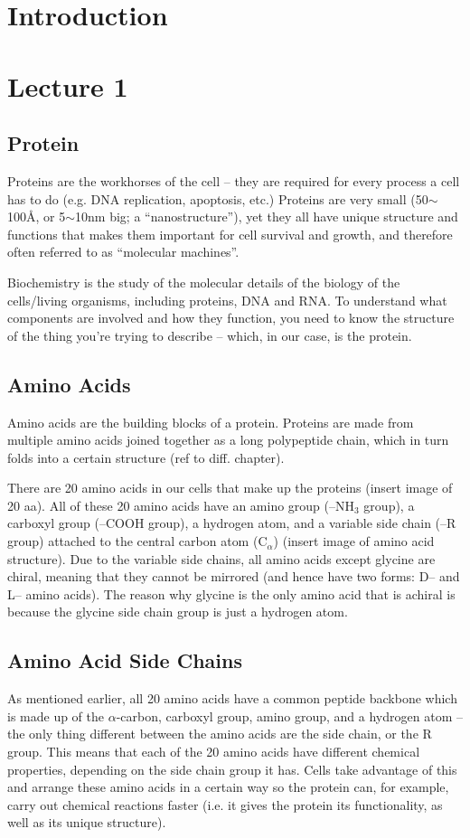 \documentclass[a4paper, 12pt]{report}
\newcommand{\mychapter}[2]{
    \setcounter{chapter}{#1}
    \setcounter{section}{0}
    \chapter*{#2}
    \addcontentsline{toc}{chapter}{#2}
}
\begin{document}


\tableofcontents
\newpage

\mychapter{0}{Introduction}

\mychapter{1}{Lecture 1}
\section{Protein}

Proteins are the workhorses of the cell -- they are required for every process a cell has to do (e.g. DNA replication, apoptosis, etc.)
Proteins are very small (50$\sim$100\AA{}, or 5$\sim$10nm big; a ``nanostructure''), yet they all have unique structure and functions that makes them important for cell survival and growth, and therefore often referred to as ``molecular machines''.

Biochemistry is the study of the molecular details of the biology of the cells/living organisms, including proteins, DNA and RNA.
To understand what components are involved and how they function, you need to know the structure of the thing you're trying to describe -- which, in our case, is the protein.

\section{Amino Acids}

Amino acids are the building blocks of a protein.
Proteins are made from multiple amino acids joined together as a long polypeptide chain, which in turn folds into a certain structure (ref to diff. chapter).

There are 20 amino acids in our cells that make up the proteins (insert image of 20 aa).
All of these 20 amino acids have an amino group (--NH$_3$ group), a carboxyl group (--COOH group), a hydrogen atom, and a variable side chain (--R group) attached to the central carbon atom (C$_{\alpha}$) (insert image of amino acid structure).
Due to the variable side chains, all amino acids except glycine are chiral, meaning that they cannot be mirrored (and hence have two forms: D-- and L-- amino acids).
The reason why glycine is the only amino acid that is achiral is because the glycine side chain group is just a hydrogen atom.

\section{Amino Acid Side Chains}

As mentioned earlier, all 20 amino acids have a common peptide backbone which is made up of the $\alpha$-carbon, carboxyl group, amino group, and a hydrogen atom -- the only thing different between the amino acids are the side chain, or the R group.
This means that each of the 20 amino acids have different chemical properties, depending on the side chain group it has.
Cells take advantage of this and arrange these amino acids in a certain way so the protein can, for example, carry out chemical reactions faster (i.e. it gives the protein its functionality, as well as its unique structure).
\end{document}
